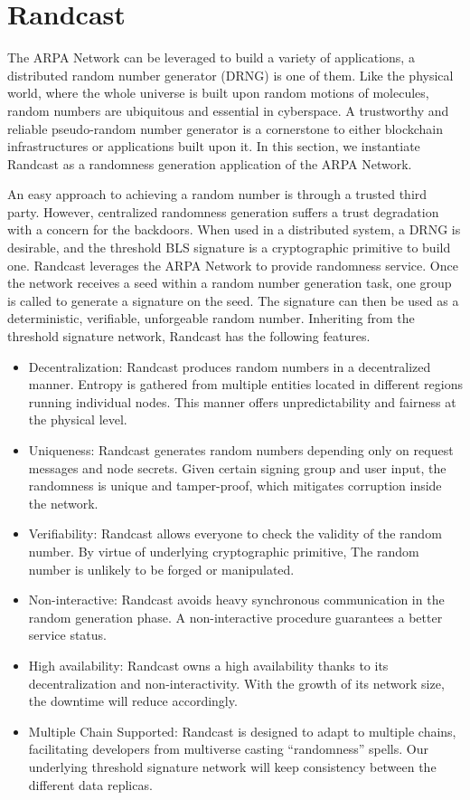 \documentclass[11pt]{article}
\begin{document}
\section{Randcast}

The ARPA Network can be leveraged to build a variety of applications, a distributed random number generator (DRNG) is one of them. Like the physical world, where the whole universe is built upon random motions of molecules, random numbers are ubiquitous and essential in cyberspace. A trustworthy and reliable pseudo-random number generator is a cornerstone to either blockchain infrastructures or applications built upon it. In this section, we instantiate Randcast as a randomness generation application of the ARPA Network.

An easy approach to achieving a random number is through a trusted third party. However, centralized randomness generation suffers a trust degradation with a concern for the backdoors. When used in a distributed system, a DRNG is desirable, and the threshold BLS signature is a cryptographic primitive to build one. Randcast leverages the ARPA Network to provide randomness service. Once the network receives a seed within a random number generation task, one group is called to generate a signature on the seed. The signature can then be used as a deterministic, verifiable, unforgeable random number. Inheriting from the threshold signature network, Randcast has the following features.

\begin{itemize}
    \item Decentralization: Randcast produces random numbers in a decentralized manner. Entropy is gathered from multiple entities located in different regions running individual nodes. This manner offers unpredictability and fairness at the physical level.
    \item Uniqueness: Randcast generates random numbers depending only on request messages and node secrets. Given certain signing group and user input, the randomness is unique and tamper-proof, which mitigates corruption inside the network.
    \item Verifiability: Randcast allows everyone to check the validity of the random number. By virtue of underlying cryptographic primitive, The random number is unlikely to be forged or manipulated.
    \item Non-interactive: Randcast avoids heavy synchronous communication in the random generation phase. A non-interactive procedure guarantees a better service status.
    \item High availability: Randcast owns a high availability thanks to its decentralization and non-interactivity. With the growth of its network size, the downtime will reduce accordingly.
    \item Multiple Chain Supported: Randcast is designed to adapt to multiple chains, facilitating developers from multiverse casting “randomness” spells. Our underlying threshold signature network will keep consistency between the different data replicas.
\end{itemize}
\end{document}
